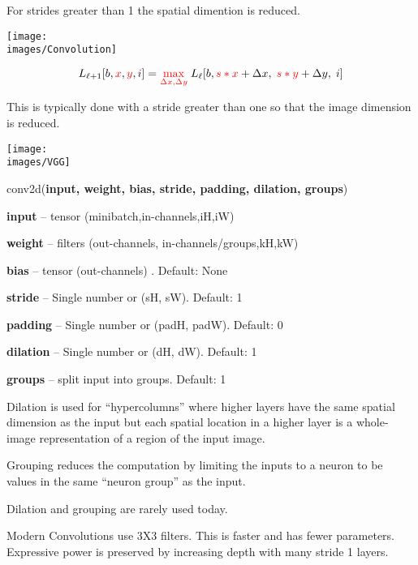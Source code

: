 {\vfill
For strides greater than 1 the spatial dimention is reduced.


\centerline{\texttt{[image: \\images/Convolution]}}

\vfill
$$L_{{\ell+1}}[b,{\color{red}x},{\color{red}y},i] = {\color{red} \max_{\Delta x, \Delta y}}\; L_{{\ell}}[b,{\color{red} s*x} + \Delta x,\; {\color{red} s*y} + \Delta y,\; i]$$

\vfill
This is typically done with a stride greater than one so that the image dimension is reduced.


\centerline{\texttt{[image: \\images/VGG]}}



conv2d({\bf input, weight, bias, stride, padding, dilation, groups})

\bigskip
{\bf input} – tensor (minibatch,in-channels,iH,iW)

\medskip
{\bf weight} – filters (out-channels, in-channels/groups,kH,kW)

\medskip
{\bf bias} – tensor (out-channels) . Default: None

\medskip
{\bf stride} – Single number or (sH, sW). Default: 1

\medskip
{\bf padding} – Single number or (padH, padW). Default: 0

\medskip
{\bf dilation} – Single number or (dH, dW). Default: 1

\medskip
{\bf groups} – split input into groups. Default: 1


Dilation is used for ``hypercolumns'' where higher layers have the same spatial dimension as the input but each spatial location in a higher layer
is a whole-image representation of a region of the input image.

\vfill
Grouping reduces the computation by limiting the inputs to a neuron to be values in the same ``neuron group'' as the input.

\vfill
Dilation and grouping are rarely used today.


Modern Convolutions use 3X3 filters.  This is faster and has fewer parameters.  Expressive power is preserved by increasing depth with many stride 1 layers.

}
